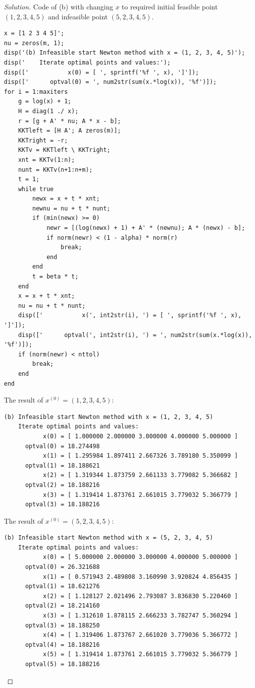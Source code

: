 \documentclass[12pt]{extarticle}
\theoremstyle{definition}
\begin{document}
\begin{proof}[Solution]
Code of (b) with changing $x$ to required initial feasible point $(1,2,3,4,5)$ and infeasible point $(5,2,3,4,5)$.
\begin{lstlisting}[style=Matlab-editor]
% (b) Infeasible start Newton method with (1, 2, 3, 4, 5)
x = [1 2 3 4 5]';
nu = zeros(m, 1);
disp('(b) Infeasible start Newton method with x = (1, 2, 3, 4, 5)');
disp('    Iterate optimal points and values:');
disp(['           x(0) = [ ', sprintf('%f ', x), ']']);
disp(['      optval(0) = ', num2str(sum(x.*log(x)), '%f')]);
for i = 1:maxiters
    g = log(x) + 1;
    H = diag(1 ./ x);
    r = [g + A' * nu; A * x - b];
    KKTleft = [H A'; A zeros(m)];
    KKTright = -r;
    KKTv = KKTleft \ KKTright;
    xnt = KKTv(1:n);
    nunt = KKTv(n+1:n+m);
    t = 1;
    while true
        newx = x + t * xnt;
        newnu = nu + t * nunt;
        if (min(newx) >= 0)
            newr = [(log(newx) + 1) + A' * (newnu); A * (newx) - b];
            if norm(newr) < (1 - alpha) * norm(r)
                break;
            end
        end
        t = beta * t;
    end
    x = x + t * xnt;
    nu = nu + t * nunt;
    disp(['           x(', int2str(i), ') = [ ', sprintf('%f ', x), ']']);
    disp(['      optval(', int2str(i), ') = ', num2str(sum(x.*log(x)), '%f')]);
    if (norm(newr) < nttol)
        break;
    end
end
\end{lstlisting}
\newpage
The result of $x^{(0)}=(1,2,3,4,5)$:
\begin{lstlisting}[style=Matlab-editor]
(b) Infeasible start Newton method with x = (1, 2, 3, 4, 5)
    Iterate optimal points and values:
           x(0) = [ 1.000000 2.000000 3.000000 4.000000 5.000000 ]
      optval(0) = 18.274498
           x(1) = [ 1.295984 1.897411 2.667326 3.789180 5.350099 ]
      optval(1) = 18.188621
           x(2) = [ 1.319344 1.873759 2.661133 3.779082 5.366682 ]
      optval(2) = 18.188216
           x(3) = [ 1.319414 1.873761 2.661015 3.779032 5.366779 ]
      optval(3) = 18.188216
\end{lstlisting}

The result of $x^{(0)}=(5,2,3,4,5)$:
\begin{lstlisting}[style=Matlab-editor]
(b) Infeasible start Newton method with x = (5, 2, 3, 4, 5)
    Iterate optimal points and values:
           x(0) = [ 5.000000 2.000000 3.000000 4.000000 5.000000 ]
      optval(0) = 26.321688
           x(1) = [ 0.571943 2.489808 3.160990 3.920824 4.856435 ]
      optval(1) = 18.621276
           x(2) = [ 1.128127 2.021496 2.793087 3.836830 5.220460 ]
      optval(2) = 18.214160
           x(3) = [ 1.312610 1.878115 2.666233 3.782747 5.360294 ]
      optval(3) = 18.188250
           x(4) = [ 1.319406 1.873767 2.661020 3.779036 5.366772 ]
      optval(4) = 18.188216
           x(5) = [ 1.319414 1.873761 2.661015 3.779032 5.366779 ]
      optval(5) = 18.188216
\end{lstlisting}
\end{proof}
\end{document}
